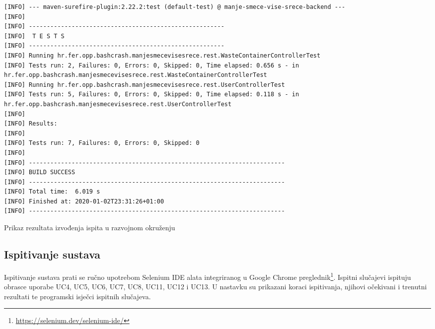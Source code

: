 \begin{listing}[H]
	\begin{verbatim}
[INFO] --- maven-surefire-plugin:2.22.2:test (default-test) @ manje-smece-vise-srece-backend ---
[INFO] 
[INFO] -------------------------------------------------------
[INFO]  T E S T S
[INFO] -------------------------------------------------------
[INFO] Running hr.fer.opp.bashcrash.manjesmecevisesrece.rest.WasteContainerControllerTest
[INFO] Tests run: 2, Failures: 0, Errors: 0, Skipped: 0, Time elapsed: 0.656 s - in hr.fer.opp.bashcrash.manjesmecevisesrece.rest.WasteContainerControllerTest
[INFO] Running hr.fer.opp.bashcrash.manjesmecevisesrece.rest.UserControllerTest
[INFO] Tests run: 5, Failures: 0, Errors: 0, Skipped: 0, Time elapsed: 0.118 s - in hr.fer.opp.bashcrash.manjesmecevisesrece.rest.UserControllerTest
[INFO] 
[INFO] Results:
[INFO] 
[INFO] Tests run: 7, Failures: 0, Errors: 0, Skipped: 0
[INFO] 
[INFO] ------------------------------------------------------------------------
[INFO] BUILD SUCCESS
[INFO] ------------------------------------------------------------------------
[INFO] Total time:  6.019 s
[INFO] Finished at: 2020-01-02T23:31:26+01:00
[INFO] ------------------------------------------------------------------------
	\end{verbatim}
	\caption{Prikaz rezultata izvođenja ispita u razvojnom okruženju}
\end{listing}
			\clearpage

			\subsection{Ispitivanje sustava}
			
		 \indent Ispitivanje sustava prati se ručno upotrebom Selenium IDE alata integriranog u Google Chrome preglednik\footnote{\url{https://selenium.dev/selenium-ide/}}. 
		 Ispitni slučajevi ispituju obrasce uporabe UC4, UC5, UC6, UC7, UC8, UC11, UC12 i UC13.
	  	 U nastavku su prikazani koraci ispitivanja, njihovi očekivani i trenutni rezultati te programski isječci ispitnih slučajeva.
		 \newline
			
